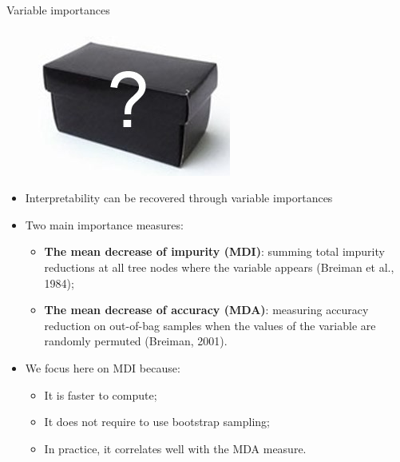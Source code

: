 \documentclass{beamer}
\begin{document}
\begin{frame}{Variable importances}

\begin{figure}
    \includegraphics[scale=0.3]{./figures/blackbox.jpg}
\end{figure}

\begin{itemize}
\item Interpretability can be recovered through {\color{blue}variable importances}

\bigskip

\item Two main importance measures:
    \begin{itemize}
    \item {\bf The mean decrease of impurity (MDI)}: summing total impurity reductions
      at all tree nodes where the variable appears {\scriptsize (Breiman et al., 1984)};
    \item {\bf The mean decrease of accuracy (MDA)}: measuring
      accuracy reduction on out-of-bag samples when the values of the
      variable are randomly permuted {\scriptsize (Breiman, 2001)}.
    \end{itemize}

\bigskip

\item We focus here on MDI because:
\begin{itemize}
\item It is faster to compute;
\item It does not require to use bootstrap sampling;
\item In practice, it correlates well with the MDA
  measure.
\end{itemize}

\end{itemize}
\end{frame}
\end{document}
